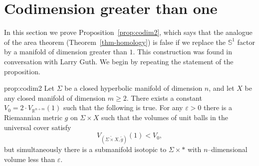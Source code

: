 \documentclass[12pt]{amsart}
\numberwithin{equation}{section}
\begin{document}
\section{Codimension greater than one}\label{sect:codim 2}

In this section we prove Proposition~\ref{prop:codim2}, which says that the analogue of the area theorem (Theorem~\ref{thm-homology}) is false if we replace the $\mathbb{S}^1$ factor by a manifold of dimension greater than $1$.  This construction was found in conversation with Larry Guth.  We begin by repeating the statement of the proposition.

\begin{repprop}{prop:codim2}
Let $\Sigma$ be a closed hyperbolic manifold of dimension $n$, and let $X$ be any closed manifold of dimension $m \geq 2$.  There exists a constant $V_0 = 2\cdot V_{\mathbb{R}^{n+m}}(1)$ such that the following is true.  For any $\varepsilon > 0$ there is a Riemannian metric $g$ on $\Sigma \times X$ such that the volumes of unit balls in the universal cover satisfy
\[V_{(\widetilde{\Sigma \times X}, \widetilde{g})}(1) < V_0,\]
but simultaneously there is a submanifold isotopic to $\Sigma \times \ast$ with $n$--dimensional volume less than $\varepsilon$.
\end{repprop}
\end{document}
